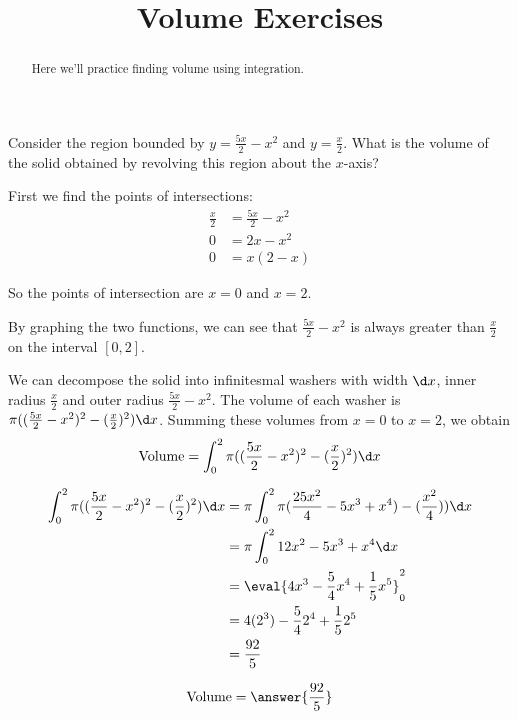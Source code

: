 \documentclass[handout]{ximera}
\title[Exercises:]{Volume Exercises}
\begin{document}
\begin{abstract}
  Here we'll practice finding volume using integration.
\end{abstract}
\maketitle

\begin{exercise}
Consider the region bounded by $y = \frac{5x}{2}-x^2$ and
$y=\frac{x}{2}$.  What is the volume of the solid obtained by
revolving this region about the $x$-axis?

\begin{hint}
  First we find the points of intersections:
  \begin{align*}
    \frac{x}{2} &= \frac{5x}{2}-x^2\\
	0 &= 2x-x^2\\
	0&= x(2-x)
	\end{align*}

  So the points of intersection are $x=0$ and $x=2$.
\end{hint}

\begin{hint}
  By graphing the two functions, we can see that $\frac{5x}{2}-x^2$ is
  always greater than $\frac{x}{2}$ on the interval $[0,2]$.
\end{hint}

\begin{hint}
  We can decompose the solid into infinitesmal washers with width
  $\d x$, inner radius $\frac{x}{2}$ and outer radius
  $\frac{5x}{2}-x^2$.  The volume of each washer is
  $\pi((\frac{5x}{2}-x^2)^2-(\frac{x}{2})^2)\d x$.  Summing these
  volumes from $x=0$ to $x=2$, we obtain
  \[
  \textrm{Volume} = \int_0^2 \pi((\frac{5x}{2}-x^2)^2-(\frac{x}{2})^2) \d x
  \]
\end{hint}

\begin{hint}
  \begin{align*}
    \int_0^2 \pi((\frac{5x}{2}-x^2)^2-(\frac{x}{2})^2) \d x&= \pi \int_0^2 \pi(\frac{25x^2}{4}-5x^3+x^4)-(\frac{x^2}{4})) \d x\\
    &=\pi \int_0^2 12x^2-5x^3+x^4 \d x\\
    &= \eval{4x^3-\frac{5}{4}x^4+\frac{1}{5}x^5}_0^2\\
    &=4(2^3)-\frac{5}{4}2^4+\frac{1}{5}2^5\\
    &=\frac{92}{5}
  \end{align*}
\end{hint}

\begin{prompt}
  \[
	\textrm{Volume} = \answer{\frac{92}{5}}
	\]
\end{prompt}

\end{exercise}
\end{document}
